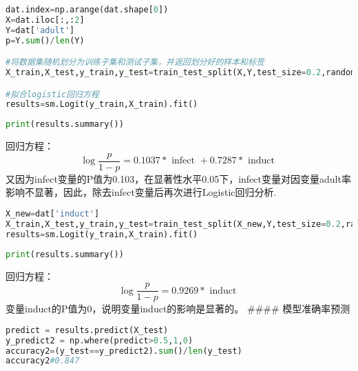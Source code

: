 \documentclass[UTF8,a4paper,12pt]{ctexart}  %
\begin{document}
\begin{lstlisting}[language=Python]
dat.index=np.arange(dat.shape[0])
X=dat.iloc[:,:2]
Y=dat['adult']
p=Y.sum()/len(Y)

#将数据集随机划分为训练子集和测试子集，并返回划分好的样本和标签
X_train,X_test,y_train,y_test=train_test_split(X,Y,test_size=0.2,random_state=0)

#拟合logistic回归方程
results=sm.Logit(y_train,X_train).fit()
\end{lstlisting}

\begin{lstlisting}[language=Python]
print(results.summary())
\end{lstlisting}

回归方程：
\[\log \frac{p}{1-p}=0.1037 * \text { infect }+0.7287 * \text { induct }\]
又因为infect变量的P值为0.103，在显著性水平0.05下，infect变量对因变量adult率影响不显著，因此，除去infect变量后再次进行Logistic回归分析.

\begin{lstlisting}[language=Python]
X_new=dat['induct']
X_train,X_test,y_train,y_test=train_test_split(X_new,Y,test_size=0.2,random_state=0)
results=sm.Logit(y_train,X_train).fit()
\end{lstlisting}

\begin{lstlisting}[language=Python]
print(results.summary())
\end{lstlisting}

回归方程：
\[\log \frac{p}{1-p}=0.9269 * \text { induct }\]
变量induct的P值为0，说明变量induct的影响是显著的。
\#\#\#\# 模型准确率预测

\begin{lstlisting}[language=Python]
predict = results.predict(X_test)  
y_predict2 = np.where(predict>0.5,1,0)
accuracy2=(y_test==y_predict2).sum()/len(y_test)
accuracy2#0.847
\end{lstlisting}
\end{document}
